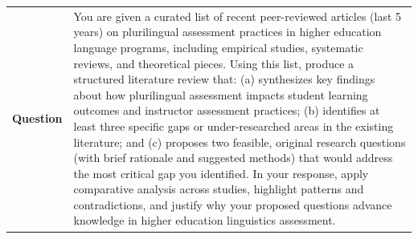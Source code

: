 \begin{longtable}{@{}l p{12.5cm}@{}}
  \textbf{Question} & You are given a curated list of recent peer-reviewed articles (last 5 years) on plurilingual assessment practices in higher education language programs, including empirical studies, systematic reviews, and theoretical pieces. Using this list, produce a structured literature review that: (a) synthesizes key findings about how plurilingual assessment impacts student learning outcomes and instructor assessment practices; (b) identifies at least three specific gaps or under-researched areas in the existing literature; and (c) proposes two feasible, original research questions (with brief rationale and suggested methods) that would address the most critical gap you identified. In your response, apply comparative analysis across studies, highlight patterns and contradictions, and justify why your proposed questions advance knowledge in higher education linguistics assessment. \\

\end{longtable}
